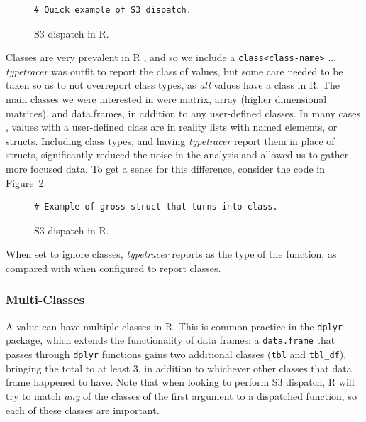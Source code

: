\documentclass[acmsmall,review,anonymous]{acmart}\settopmatter{printfolios=true,printccs=false,printacmref=false}
\newcommand{\code}[1]{{\lstinline[style=Rin]!#1!}\xspace}
\newcommand{\typetracer}{\emph{typetracer}\xspace} %
\begin{document}
\begin{figure}[htbp]
\begin{center}

\begin{lstlisting}
# Quick example of S3 dispatch.
\end{lstlisting}

\caption{S3 dispatch in R.}
\label{fig:dispatch-ex}
\end{center}
\end{figure}

Classes are very prevalent in R , and so we include a \code{class<class-name>} ... 
\typetracer was outfit to report the class of values, but some care needed to be taken so as to not overreport class types, as {\it all} values have a class in R.
The main classes we were interested in were matrix, array (higher dimensional matrices), and data.frames, in addition to any user-defined classes.
In many cases , values with a user-defined class are in reality lists with named elements, or structs.
Including class types, and having \typetracer report them in place of structs, significantly reduced the noise in the analysis and allowed us to gather more focused data.
To get a sense for this difference, consider the code in Figure~\ref{fig:class-vs-struct}.

\begin{figure}[htbp]
\begin{center}

\begin{lstlisting}
# Example of gross struct that turns into class.
\end{lstlisting}

\caption{S3 dispatch in R.}
\label{fig:class-vs-struct}
\end{center}
\end{figure}

When set to ignore classes, \typetracer reports  as the type of the function, as compared with  when configured to report classes.

%
%
\subsubsection{Multi-Classes}

A value can have multiple classes in R.
This is common practice in the \code{dplyr} package, which extends the functionality of data frames: a \code{data.frame} that passes through \code{dplyr} functions gains two additional classes (\code{tbl} and \code{tbl_df}), bringing the total to at least 3, in addition to whichever other classes that data frame happened to have.
Note that when looking to perform S3 dispatch, R will try to match {\it any} of the classes of the first argument to a dispatched function, so each of these classes are important.
\end{document}
